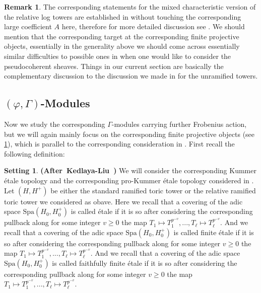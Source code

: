 \documentclass[12pt]{amsart}
\theoremstyle{definition}
\newtheorem{remark}[theorem]{Remark}
\numberwithin{equation}{section}
\newtheorem{setting}[theorem]{Setting}
\begin{document}
\begin{remark} \label{remark2.17}
The corresponding statements for the mixed characteristic version of the relative log towers are established in \cite[Chapter 7.3, Chapter 7.4]{KL16} without touching the corresponding large coefficient $A$ here, therefore for more detailed discussion see \cite[Chapter 7.3, Chapter 7.4]{KL16}. We should mention that the corresponding \cite[Chapter 7.3, Chapter 7.4]{KL16} target at the corresponding finite projective objects, essentially in the generality above we should come across essentially similar difficulties to possible ones in \cite{KL16} when one would like to consider the pseudocoherent sheaves. Things in our current section are basically the complementary discussion to the discussion we made in \cite{XT2} for the unramified towers.\\  	
\end{remark}









\subsection{$(\varphi,\Gamma)$-Modules}


\indent Now we study the corresponding $\Gamma$-modules carrying further Frobenius action, but we will again mainly focus on the corresponding finite projective objects (see \cref{remark2.17}), which is parallel to the corresponding consideration in \cite{KL16}. First recall the following definition:


\begin{setting} \mbox{\bf{(After Kedlaya-Liu \cite[Definition 7.5.3]{KL16})}} \label{setting2.18}
We will consider the corresponding Kummer \'etale topology and the corresponding pro-Kummer \'etale topology considered in \cite[Definition 7.5.3]{KL16}. Let $(H,H^+)$ be either the standard ramified toric tower or the relative ramified toric tower we considered as obave. Here we recall that a covering of the adic space $\mathrm{Spa}(H_0,H_0^+)$ is called \'etale if it is so after considering the corresponding pullback along for some integer $v\geq 0$ the map $T_1\mapsto T_1^{p^{-v}},...,T_\ell\mapsto T_\ell^{p^{-v}}$. And we recall that a covering of the adic space $\mathrm{Spa}(H_0,H_0^+)$ is called finite \'etale if it is so after considering the corresponding pullback along for some integer $v\geq 0$ the map $T_1\mapsto T_1^{p^{-v}},...,T_\ell\mapsto T_\ell^{p^{-v}}$. And we recall that a covering of the adic space $\mathrm{Spa}(H_0,H_0^+)$ is called faithfully finite \'etale if it is so after considering the corresponding pullback along for some integer $v\geq 0$ the map $T_1\mapsto T_1^{p^{-v}},...,T_\ell\mapsto T_\ell^{p^{-v}}$.	
\end{setting}
\end{document}
